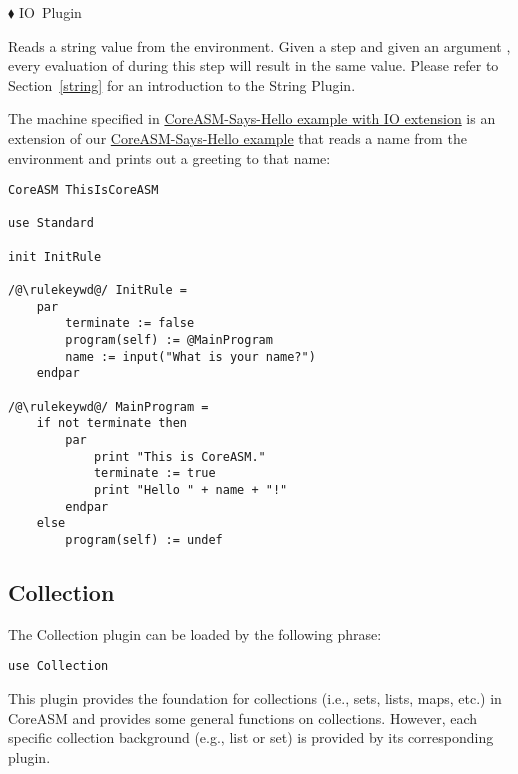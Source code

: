 \documentclass{article}
\newcommand{\CoreASM}{{\sffamily CoreASM}\xspace}
\newcommand{\funcform}[2]{\pform{$\blacklozenge$}{#1}{#2}}
\newcommand{\pform}[3]{\vspace*{4mm} \noindent #1 #2 \vspace{1mm}\textcolor[gray]{0.7}{\dotfill}\mbox{{\sffamily \footnotesize #3}}}
\begin{document}
\funcform{
}{IO Plugin}

Reads a string value from the environment. Given a step and given an argument , every evaluation of  during this step will result in the same value. Please refer to Section~\ref{string} for an introduction to the String Plugin. 

The machine specified in \hyperref[spec:sayshello]{CoreASM-Says-Hello example with IO extension} is an extension of our \hyperref[spec:thisiscoreasm]{CoreASM-Says-Hello example} that reads a name from the environment and prints out a greeting to that name:

\begin{tcolorbox}[boxrule=0.0pt,colback=gray!5!white,title={CoreASM-Says-Hello example with IO extension},label={spec:sayshello}]
\begin{lstlisting}[backgroundcolor=\color{gray!5!white},frame=none]
CoreASM ThisIsCoreASM

use Standard

init InitRule

/@\rulekeywd@/ InitRule =
	par
		terminate := false
		program(self) := @MainProgram
		name := input("What is your name?")
	endpar

/@\rulekeywd@/ MainProgram =
	if not terminate then
		par
			print "This is CoreASM."
			terminate := true
			print "Hello " + name + "!"
		endpar
	else
		program(self) := undef
\end{lstlisting}
\end{tcolorbox}


\subsection{Collection}

The Collection plugin can be loaded by the following  phrase:

\begin{lstlisting}
use Collection
\end{lstlisting}

This plugin provides the foundation for collections (i.e., sets, lists, maps, etc.) in \CoreASM and provides some general functions 
on collections. However, each specific collection background (e.g., list or set) is provided by its corresponding plugin. 
\end{document}

